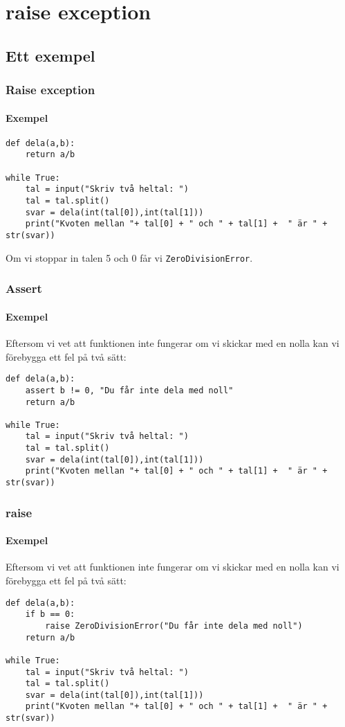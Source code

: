 \documentclass[aspectratio=169]{beamer}
\begin{document}
\section{raise exception}
\subsection{Ett exempel}

\begin{frame}[fragile]
	\frametitle{Raise exception}
	\framesubtitle{Exempel}
	
	\begin{lstlisting}
def dela(a,b):
    return a/b
    
while True:
    tal = input("Skriv två heltal: ")
    tal = tal.split()
    svar = dela(int(tal[0]),int(tal[1]))
    print("Kvoten mellan "+ tal[0] + " och " + tal[1] +  " är " + str(svar))
	\end{lstlisting}
	
	Om vi stoppar in talen 5 och 0 får vi \texttt{ZeroDivisionError}.
	
\end{frame}


\begin{frame}[fragile]
	\frametitle{Assert}
	\framesubtitle{Exempel}
	
	Eftersom vi vet att funktionen inte fungerar om vi skickar med en nolla kan vi förebygga ett fel på två sätt:

	\begin{lstlisting}
def dela(a,b):
    assert b != 0, "Du får inte dela med noll"
    return a/b
    
while True:
    tal = input("Skriv två heltal: ")
    tal = tal.split()
    svar = dela(int(tal[0]),int(tal[1]))
    print("Kvoten mellan "+ tal[0] + " och " + tal[1] +  " är " + str(svar))
	\end{lstlisting}
	
\end{frame}

\begin{frame}[fragile]
	\frametitle{raise}
	\framesubtitle{Exempel}
	
	Eftersom vi vet att funktionen inte fungerar om vi skickar med en nolla kan vi förebygga ett fel på två sätt:

	\begin{lstlisting}
def dela(a,b):
    if b == 0:
        raise ZeroDivisionError("Du får inte dela med noll")
    return a/b
    
while True:
    tal = input("Skriv två heltal: ")
    tal = tal.split()
    svar = dela(int(tal[0]),int(tal[1]))
    print("Kvoten mellan "+ tal[0] + " och " + tal[1] +  " är " + str(svar))
	\end{lstlisting}
	
\end{frame}
\end{document}
